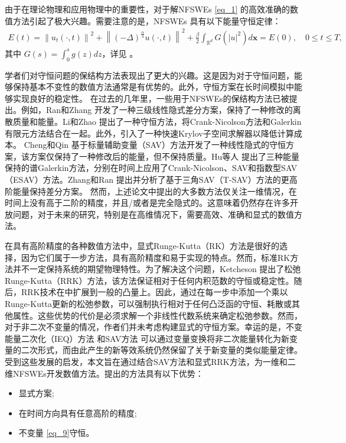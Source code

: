 由于在理论物理和应用物理中的重要性，对于解NFSWEs \eqref{eq_1} 的高效准确的数值方法引起了极大兴趣。需要注意的是，NFSWEs 具有以下能量守恒定律：
\begin{align}\label{eq_9}
E(t)=\left\|u_{t}(\cdot, t)\right\|^{2}+\left\|(-\Delta)^{\frac{\alpha}{4}} u(\cdot, t)\right\|^{2}+\frac{\beta}{2} \int_{\mathbb{R}^d} G\left(|u|^2\right) d \boldsymbol{x}=E(0), \quad 0 \leq t \leq T,
\end{align}
其中 $G(s)=\int_0^s g(z) d z$，详见 \cite{baoUniformErrorEstimates2012,ranLinearlyImplicitConservative2016}。

学者们对守恒问题的保结构方法表现出了更大的兴趣。这是因为对于守恒问题，能够保持基本不变性的数值方法通常是有优势的。此外，守恒方案在长时间模拟中能够实现良好的稳定性。
在过去的几年里，一些用于NFSWEs的保结构方法已被提出。例如，Ran和Zhang \cite{ranLinearlyImplicitConservative2016} 开发了一种三级线性隐式差分方案，保持了一种修改的离散质量和能量。Li和Zhao \cite{liFastEnergyConserving2018} 提出了一种守恒方法，将Crank-Nicolson方法和Galerkin有限元方法结合在一起。此外，引入了一种快速Krylov子空间求解器以降低计算成本。
Cheng和Qin \cite{chengConvergenceEnergyconservingScheme2022} 基于标量辅助变量（SAV）方法开发了一种线性隐式的守恒方案，该方案仅保持了一种修改后的能量，但不保持质量。Hu等人 \cite{huEfficientEnergyPreserving2022} 提出了三种能量保持的谱Galerkin方法，分别在时间上应用了Crank-Nicolson、SAV和指数型SAV（ESAV）方法。Zhang和Ran \cite{zhangHighorderStructurepreservingDifference2023} 提出并分析了基于三角SAV（T-SAV）方法的更高阶能量保持差分方案。
然而，上述论文中提出的大多数方法仅关注一维情况，在时间上没有高于二阶的精度，并且/或者是完全隐式的。这意味着仍然存在许多开放问题，对于未来的研究，特别是在高维情况下，需要高效、准确和显式的数值方法。

在具有高阶精度的各种数值方法中，显式Runge-Kutta（RK）方法是很好的选择，因为它们属于一步方法，具有高阶精度和易于实现的特点。然而，标准RK方法并不一定保持系统的期望物理特性。为了解决这个问题，Ketcheson \cite{ketchesonRelaxationRungeKutta2019} 提出了松弛Runge-Kutta（RRK）方法，该方法保证相对于任何内积范数的守恒或稳定性。随后，RRK技术在\cite{ranochaRelaxationRungeKutta2020}中扩展到一般的凸量上。因此，通过在每一步中添加一个乘以Runge-Kutta更新的松弛参数，可以强制执行相对于任何凸泛函的守恒、耗散或其他属性。这些优势的代价是必须求解一个非线性代数系统来确定松弛参数。然而，对于非二次不变量的情况，作者们并未考虑构建显式的守恒方案。幸运的是，不变能量二次化（IEQ）方法 \cite{yangLinearUnconditionallyEnergy2017, yangEfficientLinearSchemes2017} 和SAV方法 \cite{chengConvergenceEnergyconservingScheme2022} 可以通过变量变换将非二次能量转化为新变量的二次形式，而由此产生的新等效系统仍然保留了关于新变量的类似能量定律。
受到这些发展的启发，本文旨在通过结合SAV方法和显式RRK方法，为一维和二维NFSWEs开发数值方法。提出的方法具有以下优势：
\begin{itemize}
	\item 显式方案;
	\item 在时间方向具有任意高阶的精度;
	\item 不变量 \eqref{eq_9}守恒。
\end{itemize}

